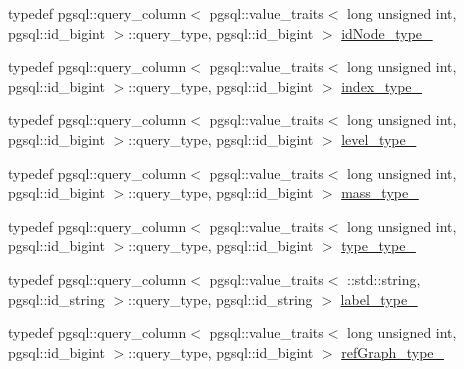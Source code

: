 \begin{DoxyCompactItemize}
\item 
typedef pgsql\+::query\+\_\+column$<$ pgsql\+::value\+\_\+traits$<$ long unsigned int, pgsql\+::id\+\_\+bigint $>$\+::query\+\_\+type, pgsql\+::id\+\_\+bigint $>$ \hyperlink{structodb_1_1pointer__query__columns_3_01_1_1_node_00_01id__pgsql_00_01_a_01_4_a52643b1b8fdce1cf30744d1b7c01cbb1}{id\+Node\+\_\+type\+\_\+}
\item 
typedef pgsql\+::query\+\_\+column$<$ pgsql\+::value\+\_\+traits$<$ long unsigned int, pgsql\+::id\+\_\+bigint $>$\+::query\+\_\+type, pgsql\+::id\+\_\+bigint $>$ \hyperlink{structodb_1_1pointer__query__columns_3_01_1_1_node_00_01id__pgsql_00_01_a_01_4_a1cdea1557e1d7e3c8e1e84d469b8a306}{index\+\_\+type\+\_\+}
\item 
typedef pgsql\+::query\+\_\+column$<$ pgsql\+::value\+\_\+traits$<$ long unsigned int, pgsql\+::id\+\_\+bigint $>$\+::query\+\_\+type, pgsql\+::id\+\_\+bigint $>$ \hyperlink{structodb_1_1pointer__query__columns_3_01_1_1_node_00_01id__pgsql_00_01_a_01_4_ae525ac3a798420edbaf6675b9f0fa7c6}{level\+\_\+type\+\_\+}
\item 
typedef pgsql\+::query\+\_\+column$<$ pgsql\+::value\+\_\+traits$<$ long unsigned int, pgsql\+::id\+\_\+bigint $>$\+::query\+\_\+type, pgsql\+::id\+\_\+bigint $>$ \hyperlink{structodb_1_1pointer__query__columns_3_01_1_1_node_00_01id__pgsql_00_01_a_01_4_ab8843582f1d0813730cd9a49ae43a195}{mass\+\_\+type\+\_\+}
\item 
typedef pgsql\+::query\+\_\+column$<$ pgsql\+::value\+\_\+traits$<$ long unsigned int, pgsql\+::id\+\_\+bigint $>$\+::query\+\_\+type, pgsql\+::id\+\_\+bigint $>$ \hyperlink{structodb_1_1pointer__query__columns_3_01_1_1_node_00_01id__pgsql_00_01_a_01_4_afc7b49347ca96fcd3a1328dcb4f9f214}{type\+\_\+type\+\_\+}
\item 
typedef pgsql\+::query\+\_\+column$<$ pgsql\+::value\+\_\+traits$<$ \+::std\+::string, pgsql\+::id\+\_\+string $>$\+::query\+\_\+type, pgsql\+::id\+\_\+string $>$ \hyperlink{structodb_1_1pointer__query__columns_3_01_1_1_node_00_01id__pgsql_00_01_a_01_4_a7657c74a8e1c7e6d81e8663a3106ce72}{label\+\_\+type\+\_\+}
\item 
typedef pgsql\+::query\+\_\+column$<$ pgsql\+::value\+\_\+traits$<$ long unsigned int, pgsql\+::id\+\_\+bigint $>$\+::query\+\_\+type, pgsql\+::id\+\_\+bigint $>$ \hyperlink{structodb_1_1pointer__query__columns_3_01_1_1_node_00_01id__pgsql_00_01_a_01_4_a76e6e437dcf4f65a556b2087a1743c4c}{ref\+Graph\+\_\+type\+\_\+}
\end{DoxyCompactItemize}
